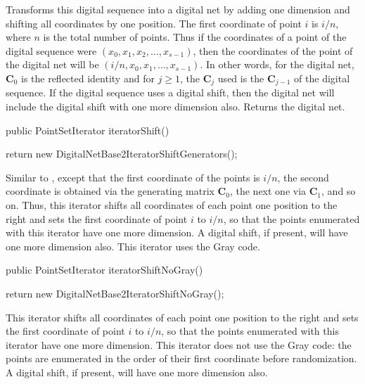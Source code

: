 \begin{tabb}
  Transforms this digital sequence into a digital net by adding one dimension
  and shifting all coordinates by one position. The first coordinate of point
  $i$ is $i/n$, where $n$ is the total number of points.
  Thus if the coordinates of a point of the digital sequence were
  $(x_0, x_1, x_2, \ldots, x_{s-1})$, then the coordinates of the
  point of the digital net will be $(i/n, x_0, x_1, \ldots, x_{s-1})$.
  In other words, for the digital net, $\mathbf{C}_0$ is the reflected 
  identity and for $j\ge 1$, the $\mathbf{C}_j$ used is the
  $\mathbf{C}_{j-1}$ of the digital sequence.  If the digital sequence uses
  a digital shift, then the digital net will include the digital shift with
  one more dimension also. Returns the digital net.
\end{tabb}
\begin{code}

   public PointSetIterator iteratorShift()\begin{hide} {
      return new DigitalNetBase2IteratorShiftGenerators();
   }\end{hide}
\end{code}
\begin{tabb}
  Similar to , except that the first coordinate
  of the points is $i/n$, the second coordinate is obtained via
  the generating matrix $\mathbf{C}_0$, the next one via $\mathbf{C}_1$, 
  and so on. Thus, this iterator shifts all coordinates of each point
  one position to the right and sets the first coordinate of point $i$
  to  $i/n$, so that the points enumerated with this iterator have one more
  dimension. A digital shift, if present, will have one more dimension also.
  This iterator uses the Gray code.
\end{tabb}
\begin{code}

   public PointSetIterator iteratorShiftNoGray()\begin{hide} {
      return new DigitalNetBase2IteratorShiftNoGray();
   }\end{hide}
\end{code}
\begin{tabb}
  This iterator shifts all coordinates of each point one position to the right
  and sets the first coordinate of point $i$  to  $i/n$, so that the points 
  enumerated with this iterator have one more dimension. This iterator
  does not use the Gray code: the points are enumerated in the order of 
  their first coordinate before randomization.
  A digital shift, if present, will have one more dimension also.
\end{tabb}
